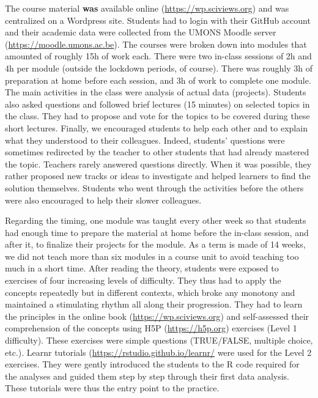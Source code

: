 \documentclass{aims}
\theoremstyle{definition}
\begin{document}
The course material \textbf{was} available online
(\url{https://wp.sciviews.org}) and was centralized on a Wordpress site.
Students had to login with their GitHub account and their academic data
were collected from the UMONS Moodle server
(\url{https://moodle.umons.ac.be}). The courses were broken down into
modules that amounted of roughly 15h of work each. There were two
in-class sessions of 2h and 4h per module (outside the lockdown periods,
of course). There was roughly 3h of preparation at home before each
session, and 3h of work to complete one module. The main activities in
the class were analysis of actual data (projects). Students also asked
questions and followed brief lectures (15 minutes) on selected topics in
the class. They had to propose and vote for the topics to be covered
during these short lectures. Finally, we encouraged students to help
each other and to explain what they understood to their colleagues.
Indeed, students' questions were sometimes redirected by the teacher to
other students that had already mastered the topic. Teachers rarely
answered questions directly. When it was possible, they rather proposed
new tracks or ideas to investigate and helped learners to find the
solution themselves. Students who went through the activities before the
others were also encouraged to help their slower colleagues.

Regarding the timing, one module was taught every other week so that
students had enough time to prepare the material at home before the
in-class session, and after it, to finalize their projects for the
module. As a term is made of 14 weeks, we did not teach more than six
modules in a course unit to avoid teaching too much in a short time.
After reading the theory, students were exposed to exercises of four
increasing levels of difficulty. They thus had to apply the concepts
repeatedly but in different contexts, which broke any monotony and
maintained a stimulating rhythm all along their progression. They had to
learn the principles in the online book (\url{https://wp.sciviews.org})
and self-assessed their comprehension of the concepts using H5P
(\url{https://h5p.org}) exercises (Level 1 difficulty). These exercises
were simple questions (TRUE/FALSE, multiple choice, etc.). Learnr
tutorials (\url{https://rstudio.github.io/learnr/} were used for the
Level 2 exercises. They were gently introduced the students to the R
code required for the analyses and guided them step by step through
their first data analysis. These tutorials were thus the entry point to
the practice.
\end{document}
